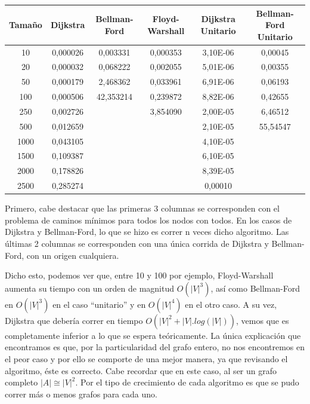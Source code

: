 \documentclass[a4paper,10pt]{article}
\begin{document}
	\begin{center}
		\begin{tabular}{ |c|c|c|c|c|c| }
			\hline
			\textbf{Tamaño} & \textbf{Dijkstra} & \textbf{Bellman-Ford} & \textbf{Floyd-Warshall} & \textbf{Dijkstra Unitario} & \textbf{Bellman-Ford Unitario} \\ 
			\hline
			10 & 0,000026 & 0,003331 & 0,000353 & 3,10E-06 & 0,00045 \\ \hline
			20 & 0,000032 & 0,068222 & 0,002055 & 5,01E-06 & 0,00355\\ \hline
			50 & 0,000179 & 2,468362 & 0,033961 & 6,91E-06 & 0,06193\\ \hline
			100 & 0,000506 & 42,353214 & 0,239872 & 8,82E-06 & 0,42655\\ \hline
			250 & 0,002726 &   & 3,854090 & 2,00E-05 & 6,46512\\ \hline
			500 & 0,012659 &   &   & 2,10E-05 & 55,54547\\ \hline
			1000 & 0,043105 &   &   & 4,10E-05 &  \\ \hline
			1500 & 0,109387 &   &   & 6,10E-05 &  \\ \hline
			2000 & 0,178826 &   &   & 8,39E-05 &  \\ \hline
			2500 & 0,285274 &   &   & 0,00010 &  \\
			\hline
		\end{tabular}
	\end{center}

	Primero, cabe destacar que las primeras 3 columnas se corresponden con el problema de caminos mínimos para todos los nodos con todos. En los casos de Dijkstra y Bellman-Ford, lo que se hizo es correr n veces dicho algoritmo. Las últimas 2 columnas se corresponden con una única corrida de Dijkstra y Bellman-Ford, con un origen cualquiera.

	Dicho esto, podemos ver que, entre 10 y 100 por ejemplo, Floyd-Warshall aumenta su tiempo con un orden de magnitud $O(|V|^3)$, así como Bellman-Ford en $O(|V|^3)$ en el caso ``unitario'' y en $O(|V|^4)$ en el otro caso. A su vez, Dijkstra que debería correr en tiempo $O(|V|^2+|V|.log(|V|))$, vemos que es completamente inferior a lo que se espera teóricamente. La única explicación que encontramos es que, por la particularidad del grafo entero, no nos encontremos en el peor caso y por ello se comporte de una mejor manera, ya que revisando el algoritmo, éste es correcto. Cabe recordar que en este caso, al ser un grafo completo $|A| \cong |V|^2$. Por el tipo de crecimiento de cada algoritmo es que se pudo correr más o menos grafos para cada uno.
\end{document}
